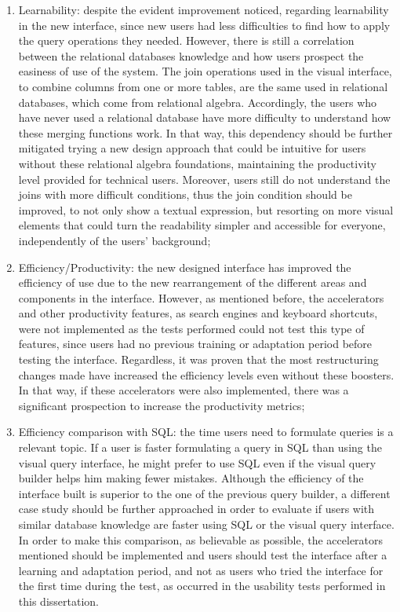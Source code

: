 \begin{enumerate}
    \item Learnability: despite the evident improvement noticed, regarding learnability in the new interface, since new users had less difficulties to find how to apply the query operations they needed. However, there is still a correlation between the relational databases knowledge and how users prospect the easiness of use of the system. The join operations used in the visual interface, to combine columns from one or more tables, are the same used in relational databases, which come from relational algebra. Accordingly, the users who have never used a relational database have more difficulty to understand how these merging functions work. In that way, this dependency should be further mitigated trying a new design approach that could be intuitive for users without these relational algebra foundations, maintaining the productivity level provided for technical users. Moreover, users still do not understand the joins with more difficult conditions, thus the join condition should be improved, to not only show a textual expression, but resorting on more visual elements that could turn the readability simpler and accessible for everyone, independently of the users' background;
    \item Efficiency/Productivity: the new designed interface has improved the efficiency of use due to the new rearrangement of the different areas and components in the interface. However, as mentioned before, the accelerators and other productivity features, as search engines and keyboard shortcuts, were not implemented as the tests performed could not test this type of features, since users had no previous training or adaptation period before testing the interface. Regardless, it was proven that the most restructuring changes made have increased the efficiency levels even without these boosters. In that way, if these accelerators were also implemented, there was a significant prospection to increase the productivity metrics;
    \item Efficiency comparison with \gls{SQL}: the time users need to formulate queries is a relevant topic. If a user is faster formulating a query in \gls{SQL} than using the visual query interface, he might prefer to use \gls{SQL} even if the visual query builder helps him making fewer mistakes. Although the efficiency of the interface built is superior to the one of the previous query builder, a different case study should be further approached in order to evaluate if users with similar database knowledge are faster using SQL or the visual query interface. In order to make this comparison, as believable as possible, the accelerators mentioned should be implemented and users should test the interface after a learning and adaptation period, and not as users who tried the interface for the first time during the test, as occurred in the usability tests performed in this dissertation.
    


\end{enumerate}
